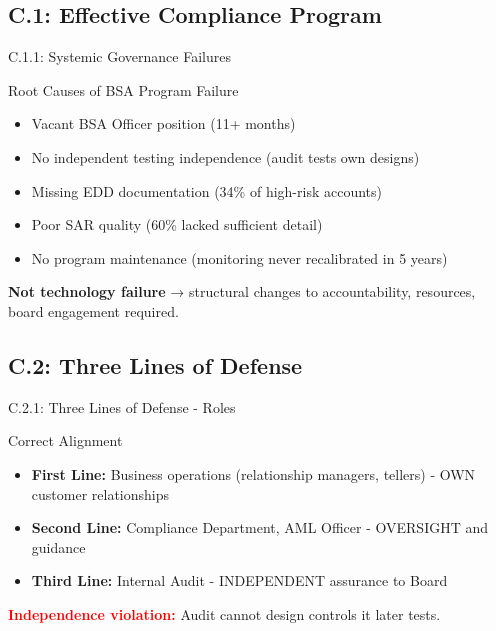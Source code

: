 \documentclass{beamer}
\begin{document}
	\subsection{C.1: Effective Compliance Program}
	
	\begin{frame}{C.1.1: Systemic Governance Failures}
		\begin{block}{Root Causes of BSA Program Failure}
			\begin{itemize}
				\item Vacant BSA Officer position (11+ months)
				\item No independent testing independence (audit tests own designs)
				\item Missing EDD documentation (34\% of high-risk accounts)
				\item Poor SAR quality (60\% lacked sufficient detail)
				\item No program maintenance (monitoring never recalibrated in 5 years)
			\end{itemize}
		\end{block}
		\textbf{Not technology failure} → structural changes to accountability, resources, board engagement required.
	\end{frame}
	
	\subsection{C.2: Three Lines of Defense}
	
	\begin{frame}{C.2.1: Three Lines of Defense - Roles}
		\begin{block}{Correct Alignment}
			\begin{itemize}
				\item \textbf{First Line:} Business operations (relationship managers, tellers) - OWN customer relationships
				\item \textbf{Second Line:} Compliance Department, AML Officer - OVERSIGHT and guidance
				\item \textbf{Third Line:} Internal Audit - INDEPENDENT assurance to Board
			\end{itemize}
		\end{block}
		\textcolor{red}{\textbf{ Independence violation:}} Audit cannot design controls it later tests.
	\end{frame}
	
\end{document}
